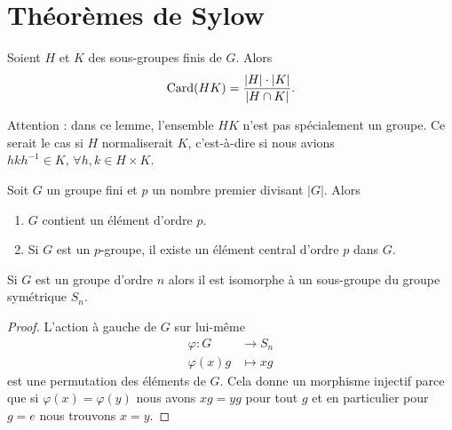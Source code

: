 
\section{Théorèmes de Sylow}

\begin{lemma}
    Soient \( H\) et \( K\) des sous-groupes finis de \( G\). Alors
    \begin{equation}
        \operatorname{Card}(HK)=\frac{ | H |\cdot | K | }{ | H\cap K | }.
    \end{equation}
\end{lemma}
Attention : dans ce lemme, l'ensemble \( HK\) n'est pas spécialement un groupe. Ce serait le cas si \( H\) normaliserait \( K\), c'est-à-dire si nous avions \( hkh^{-1}\in K,\,\forall h,k\in H\times K\).

\begin{theorem}\label{ThoCauchyGpFini}
    Soit \( G\) un groupe fini et \( p\) un nombre premier divisant \( | G |\). Alors
    \begin{enumerate}
        \item
            \( G\) contient un élément d'ordre \( p\).
        \item
            Si \( G\) est un \( p\)-groupe, il existe un élément central d'ordre \( p\) dans \( G\).
    \end{enumerate}
\end{theorem}

\begin{lemma}    \label{ThoIfdlEB}   
    Si \( G\) est un groupe d'ordre \( n\) alors il est isomorphe à un sous-groupe du groupe symétrique \( S_n\).
\end{lemma}

\begin{proof}
    L'action à gauche de \( G\) sur lui-même
    \begin{equation}
        \begin{aligned}
            \varphi\colon G&\to S_n \\
            \varphi(x)g&\mapsto xg
        \end{aligned}
    \end{equation}
    est une permutation des éléments de \( G\). Cela donne un morphisme injectif parce que si \( \varphi(x)=\varphi(y)\) nous avons \( xg=yg\) pour tout \( g\) et en particulier pour \( g=e\) nous trouvons \( x=y\).
\end{proof}

